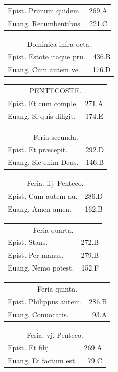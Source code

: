 \documentclass[a5paper,10pt]{book}
\def\ae{æ}
\begin{document}
\begin{multicols}{2}
\begin{tabular}{l r}
Epist. Primum quidem. & 269.A\\
Euang. Recumbentibus. & 221.C\\
\end{tabular}
\begin{tabular}{l r}
\multicolumn{2}{c}{\color{red} Dominica infra octa.}\\
Epist. Estote itaque pru. & 436.B\\
Euang. Cum autem ve. & 176.D\\
\end{tabular}
\begin{tabular}{l r}
\multicolumn{2}{c}{\color{red} \large PENTECOSTE.}\\
Epist. Et cum comple. & 271.A\\
Euang. Si quis diligit. & 174.E\\
\end{tabular}
\begin{tabular}{l r}
\multicolumn{2}{c}{\color{red} Feria secunda.}\\
Epist. Et pr\ae cepit. & 292.D\\
Euang. Sic enim Deus. & 146.B\\
\end{tabular}
\begin{tabular}{l r}
\multicolumn{2}{c}{\color{red} Feria. iij. Penteco.}\\
Epist. Cum autem au. & 286.D\\
Euang. Amen amen. & 162.B\\
\end{tabular}
\begin{tabular}{l r}
\multicolumn{2}{c}{\color{red} Feria quarta.}\\
Epist. Stans. & 272.B\\
Epist. Per manus. & 279.B\\
Euang. Nemo potest. & 152.F\\
\end{tabular}
\begin{tabular}{l r}
\multicolumn{2}{c}{\color{red} Feria quinta.}\\
Epist. Philippus autem. & 286.B\\
Euang. Conuocatis. & 93.A\\
\end{tabular}
\begin{tabular}{l r}
\multicolumn{2}{c}{\color{red} Feria. vj. Penteco.}\\
Epist. Et filij. & 269.A\\
Euang, Et factum est. & 79.C\\%

\end{tabular}
\end{multicols}
\end{document}
